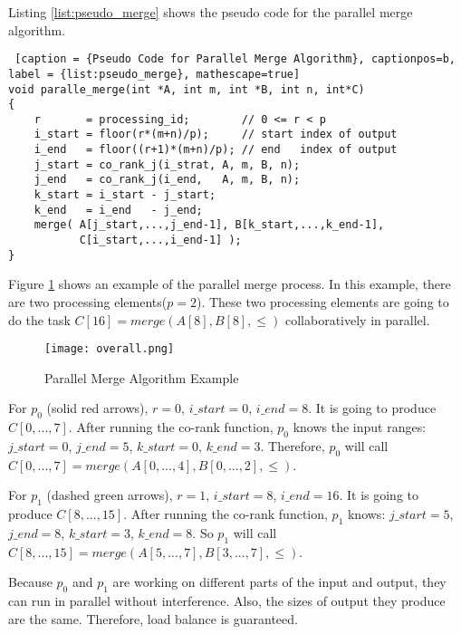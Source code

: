     Listing \ref{list:pseudo_merge} shows the pseudo code for the parallel merge algorithm.

    \begin{minipage}{\linewidth}
    \begin{singlespace}
    \begin{lstlisting} [caption = {Pseudo Code for Parallel Merge Algorithm}, captionpos=b, label = {list:pseudo_merge}, mathescape=true]
void paralle_merge(int *A, int m, int *B, int n, int*C) 
{
    r       = processing_id;        // 0 <= r < p
    i_start = floor(r*(m+n)/p);     // start index of output 
    i_end   = floor((r+1)*(m+n)/p); // end   index of output 
    j_start = co_rank_j(i_strat, A, m, B, n);
    j_end   = co_rank_j(i_end,   A, m, B, n);
    k_start = i_start - j_start;
    k_end   = i_end   - j_end;
    merge( A[j_start,...,j_end-1], B[k_start,...,k_end-1],
           C[i_start,...,i_end-1] );
}
    \end{lstlisting}
    \end{singlespace}
    \end{minipage}

    Figure \ref{fig:overall} shows an example of the parallel merge process. In this example,
    there are two processing elements($p=2$). These two processing elements are going to do 
    the task $C[16] = merge(A[8],B[8],\leq)$ collaboratively in parallel. 

    \begin{figure}[!h]
    \begin{center}
    \texttt{[image: overall.png]}
    \end{center}
    \caption{{\label{fig:overall}} Parallel Merge Algorithm Example}
    \end{figure}   
 
    For $p_0$ (solid red arrows), $r = 0$, $i\_start = 0$, $i\_end=8$. It is going to produce
    $C[0,...,7]$. After running the co-rank function, $p_0$ knows the input ranges: $j\_start = 0$, 
    $j\_end=5$, $k\_start = 0$, $k\_end=3$. Therefore, $p_0$ will call 
    $C[0,...,7] = merge(A[0,...,4],B[0,...,2],\leq)$.

    For $p_1$ (dashed green arrows), $r = 1$, $i\_start = 8$, $i\_end=16$. It is going to produce
    $C[8,...,15]$. After running the co-rank function, $p_1$ knows: $j\_start = 5$, 
    $j\_end=8$, $k\_start = 3$, $k\_end=8$. So $p_1$ will call 
    $C[8,...,15] = merge( A[5,...,7],B[3,...,7],\leq)$.

    Because $p_0$ and $p_1$ are working on different parts of the input and output, they can run in 
    parallel without interference. Also, the sizes of output they produce are the same. 
    Therefore, load balance is guaranteed.      



